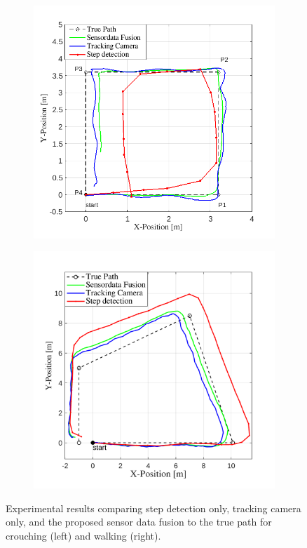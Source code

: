 \documentclass[engproc,conferenceproceedings,submit,pdftex,moreauthors]{Definitions/mdpi}
\begin{document}
\begin{figure}
	\centering
	\begin{subfigure}[b]{0.49\textwidth}
		\centering
		\hspace{-2.5cm}
		\includegraphics[width=1.11\textwidth]{Path.png}
	\end{subfigure}
	\hfill
	\begin{subfigure}[b]{0.49\textwidth}
		\centering
		\hspace{-1cm}
		\includegraphics[width=1.1\textwidth]{Path2.png}
	\end{subfigure}
\caption{Experimental results comparing step detection only, tracking camera only, and the proposed sensor data fusion to the true path for crouching (left) and walking (right).}
\label{fig:path}
\end{figure}
\end{document}
